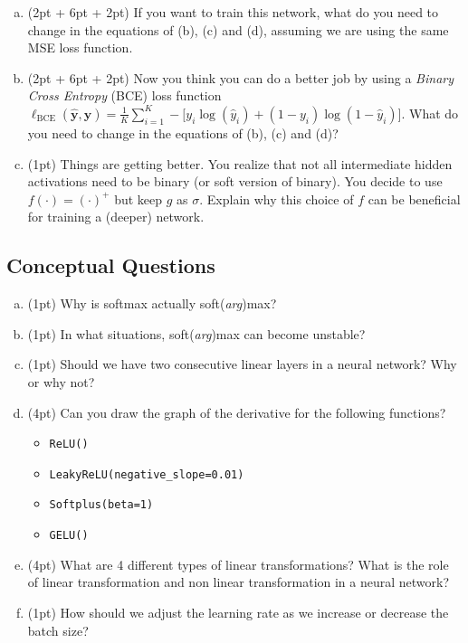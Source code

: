 \begin{enumerate}[(a)] 
\item
(2pt + 6pt + 2pt) If you want to train this network, what do you need to change in the equations of (b), (c) and (d), assuming we are using the same MSE loss function.

\item
(2pt + 6pt + 2pt) Now you think you can do a better job by using a \emph{Binary Cross Entropy} (BCE) loss function $\ell_\text{BCE}(\bm{\hat{y}}, \bm{y}) = \frac{1}{K}\sum_{i=1}^K -\big[y_i \log(\hat{y}_i) + (1 - y_i)\log(1 - \hat{y}_i)\big]$.
What do you need to change in the equations of (b), (c) and (d)?

\item
(1pt) Things are getting better.
You realize that not all intermediate hidden activations need to be binary (or soft version of binary).
You decide to use $f(\cdot) = (\cdot)^+$ but keep $g$ as $\sigma$. Explain why this choice of $f$ can be beneficial for training a (deeper) network.


\end{enumerate}

\subsection{Conceptual Questions}

\begin{enumerate}[(a)]
    \item (1pt) Why is softmax actually soft(\textit{arg})max?
    \item (1pt) In what situations, soft(\textit{arg})max can become unstable?
    \item (1pt) Should we have two consecutive linear layers in a neural network? Why or why not? 
    
    \item (4pt) Can you draw the graph of the derivative for the following functions?
    \begin{itemize}
        \item \texttt{ReLU()}
        \item \texttt{LeakyReLU(negative\_slope=0.01)}
        \item \texttt{Softplus(beta=1)}
        \item \texttt{GELU()}
    \end{itemize}
    
    \item (4pt) What are 4 different types of linear transformations? What is the role of linear transformation and non linear transformation in a neural network?
    \item (1pt) How should we adjust the learning rate as we increase or decrease the batch size?
    
    
\end{enumerate}


